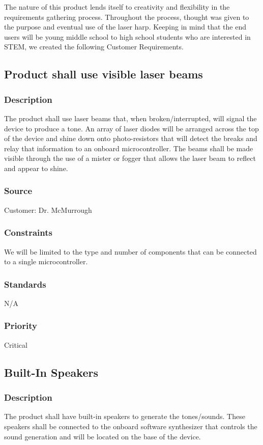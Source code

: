 The nature of this product lends itself to creativity and flexibility in the requirements gathering process. Throughout the process, thought was given to the purpose and eventual use of the laser harp. Keeping in mind that the end users will be young middle school to high school students who are interested in STEM, we created the following Customer Requirements.
\subsection{Product shall use visible laser beams}
\subsubsection{Description}
The product shall use laser beams that, when broken/interrupted, will signal the device to produce a tone. An array of laser diodes will be arranged across the top of the device and shine down onto photo-resistors that will detect the breaks and relay that information to an onboard microcontroller. The beams shall be made visible through the use of a mister or fogger that allows the laser beam to reflect and appear to shine.
\subsubsection{Source}
Customer: Dr. McMurrough
\subsubsection{Constraints}
We will be limited to the type and number of components that can be connected to a single microcontroller.
\subsubsection{Standards}
N/A
\subsubsection{Priority}
Critical

\subsection{Built-In Speakers}
\subsubsection{Description}
The product shall have built-in speakers to generate the tones/sounds. These speakers shall be connected to the onboard software synthesizer that controls the sound generation and will be located on the base of the device.
